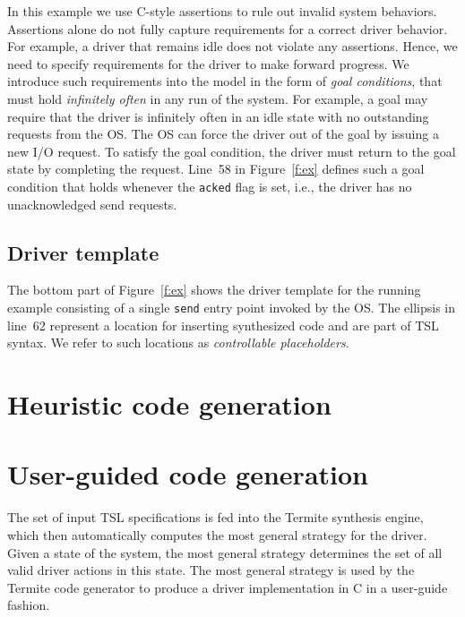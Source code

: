\documentclass{book}
\newcommand{\termite}{Termite\xspace}
\newcommand{\tsl}{TSL\xspace}
\theoremstyle{definition}
\newcommand{\src}[1]{\texttt{\small #1}}
\begin{document}
In this example we use C-style assertions to rule out invalid system behaviors.  Assertions alone do not fully capture requirements for a correct driver behavior.  For example, a driver that remains idle does not violate any assertions.  Hence, we need to specify requirements for the driver to make forward progress.  We introduce such requirements into the model in the form of \emph{goal conditions}, that must hold \emph{infinitely often} in any run of the system.  For example, a goal may require that the driver is infinitely often in an idle state with no outstanding requests from the OS.  The OS can force the driver out of the goal by issuing a new I/O request.  To satisfy the goal condition, the driver must return to the goal state by completing the request.  Line~58 in Figure~\ref{f:ex} defines such a goal condition that holds whenever the \src{acked} flag is set, i.e., the driver has no unacknowledged send requests.

\subsection{Driver template}

The bottom part of Figure~\ref{f:ex} shows the driver template for the running example consisting of a single \src{send} entry point invoked by the OS.  The ellipsis in line~62 represent a location for inserting synthesized code and are part of \tsl syntax.  We refer to such locations as \emph{controllable placeholders}. 

\section{Heuristic code generation}

\section{User-guided code generation}
\label{s:user-guided}

The set of input \tsl specifications is fed into the \termite synthesis engine, which then automatically computes the most general strategy for the driver.  Given a state of the system, the most general strategy determines the set of all valid driver actions in this state.  The most general strategy is used by the \termite code generator to produce a driver implementation in C in a user-guide fashion.
\end{document}
